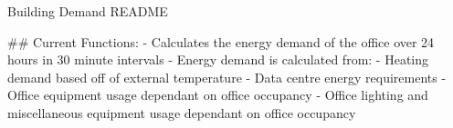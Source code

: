 Building Demand README

## Current Functions:
	- Calculates the energy demand of the office over 24 hours in 30 minute intervals
	- Energy demand is calculated from:
		- Heating demand based off of external temperature
		- Data centre energy requirements
		- Office equipment usage dependant on office occupancy
		- Office lighting and miscellaneous equipment usage dependant on office occupancy